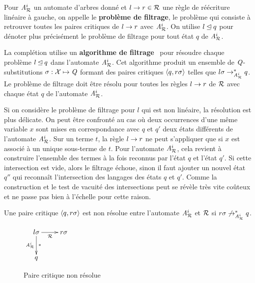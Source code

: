 \begin{definition}
  Pour ${\mathit A}_{\mathcal R}^i$ un automate d'arbres donné et $l \rightarrow r \in \mathcal R$ une
  règle de réécriture linéaire à gauche, on appelle le \textbf{problème de filtrage}, le
  problème qui consiste à retrouver toutes les paires critiques de $l
  \rightarrow r$ avec ${\mathit A}_{\mathcal R}^i$. On utilise $l \unlhd q$ pour dénoter plus précisément
  le problème de filtrage pour tout état $q$ de ${\mathit A}_{\mathcal R}^i$.
\end{definition}

La complétion utilise un \textbf{algorithme de filtrage}~\cite{FeuilladeGVTT-JAR04}
pour résoudre chaque problème $l \unlhd q$ dans l'automate ${\mathit A}_{\mathcal R}^i$. 
Cet algorithme produit un ensemble de $\mathit Q$-substitutions $\sigma: \mathcal X \mapsto \mathit Q$
formant des paires critiques $\langle q, r\sigma\rangle$ telles que $l\sigma \rightarrow_{{\mathit A}_{\mathcal R}^i}^* q$.
Le problème de filtrage doit être résolu pour toutes les règles $l\rightarrow r$ de $\mathcal R$ avec
chaque état $q$ de l'automate ${\mathit A}_{\mathcal R}^i$.

Si on considère le problème de filtrage pour $l$ qui est non linéaire, la résolution est plus
délicate. On peut être confronté au cas où deux occurrences d'une même variable $x$
sont mises en correspondance avec $q$ et $q'$ deux états différents de l'automate ${\mathit A}_{\mathcal R}^i$. 
Sur un terme $t$, la règle $l\rightarrow r$ ne peut s'appliquer que si $x$ est associé à un unique sous-terme
de $t$. Pour l'automate ${\mathit A}_{\mathcal R}^i$, cela revient à construire l'ensemble des termes à la fois reconnus
par l'état $q$ et l'état $q'$. Si cette intersection est vide, alors le filtrage échoue, 
sinon il faut ajouter un nouvel état $q''$ qui reconnaît l'intersection des langages des états $q$ et $q'$.
Comme la construction et le test de vacuité des intersections peut se révèle très vite coûteux et ne passe
pas bien à l'échelle pour cette raison.

\begin{definition}
  Une paire critique $\langle q, r\sigma\rangle$ est non résolue entre l'automate ${\mathit A}_{\mathcal R}^i$ et $\mathcal R$ si $r\sigma \not\rightarrow_{{\mathit A}_{\mathcal R}^i}^* q$.
  \begin{figure}[ht!]
    \centering
    $
    \xymatrix{
      l\sigma \ar[r]_{\R}\ar[d]^{*}_{\aaex^i} & r\sigma \\%
      q & %
    }
    $
    \caption{\footnotesize Paire critique non résolue\label{fig:cp}}
  \end{figure}  
\end{definition}

